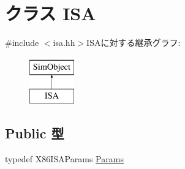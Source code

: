 \hypertarget{classX86ISA_1_1ISA}{
\section{クラス ISA}
\label{classX86ISA_1_1ISA}
}


{\ttfamily \#include $<$isa.hh$>$}ISAに対する継承グラフ:\begin{figure}[H]
\begin{center}
\leavevmode
\includegraphics[height=2cm]{classX86ISA_1_1ISA}
\end{center}
\end{figure}
\subsection*{Public 型}
\begin{DoxyCompactItemize}
\item 
typedef X86ISAParams \hyperlink{classX86ISA_1_1ISA_a479c84ea8074d124d1ddd320ef027439}{Params}
\end{DoxyCompactItemize}
